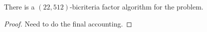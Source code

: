 \begin{theorem}
	There is a $\left(22,512\right)$-bicriteria factor algorithm for the \mckc problem.
\end{theorem}
\begin{proof}

Need to do the final accounting.
\end{proof}
